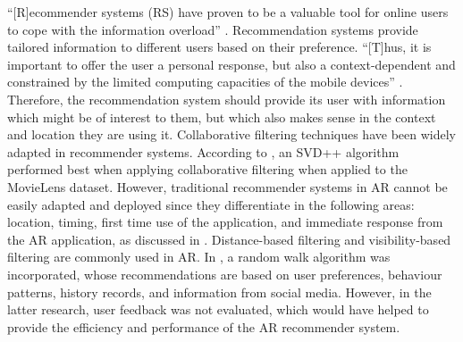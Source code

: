 \documentclass{aifyp}
\begin{document}
\indent “[R]ecommender systems (RS) have proven to be a valuable tool for online users to cope with the information overload” \cite{Miguel2014ARLodgeC}. Recommendation systems provide tailored information to different users based on their preference. “[T]hus, it is important to offer the user a personal response, but also a context-dependent and constrained by the limited computing capacities of the mobile devices” \cite{Miguel2014ARLodgeC,Adomavicius2011,LocContectRecSyst,RecSysHandbook}. Therefore, the recommendation system should provide its user with information which might be of interest to them, but which also makes sense in the context and location they are using it.
\newline
\newline
\indent Collaborative filtering techniques have been widely adapted in recommender systems. According to \cite{CollaborativeComparison}, an SVD++ algorithm performed best when applying collaborative filtering when applied to the MovieLens dataset. However, traditional recommender systems in AR cannot be easily adapted and deployed since they differentiate in the following areas: location, timing, first time use of the application, and immediate response from the AR application, as discussed in \cite{10.1145/2507157.2507211}. Distance-based filtering and visibility-based filtering are commonly used in AR. In \cite{10.1145/2507157.2507211}, a random walk algorithm was incorporated, whose recommendations are based on user preferences, behaviour patterns, history records, and information from social media. However, in the latter research, user feedback was not evaluated, which would have helped to provide the efficiency and performance of the AR recommender system.
\newline
\newline
\end{document}
